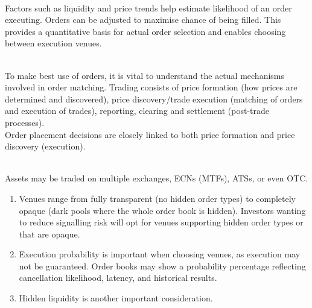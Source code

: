 \begin{remark} \\
Factors such as liquidity and price trends help estimate likelihood of an order executing. Orders can be adjusted to maximise chance of being filled. This provides a quantitative basis for actual order selection and enables choosing between execution venues.
\end{remark}

\begin{remark} \\
To make best use of orders, it is vital to understand the actual mechanisms involved in order matching. Trading consists of price formation (how prices are determined and discovered), price discovery/trade execution (matching of orders and execution of trades), reporting, clearing and settlement (post-trade processes).\\
Order placement decisions are closely linked to both price formation and price discovery (execution).
\end{remark}

\begin{remark} \\
Assets may be traded on multiple exchanges, ECNs (MTFs), ATSs, or even OTC.
\begin{enumerate}[label=\roman*.]
\setlength{\itemsep}{0pt}
\item Venues range from fully transparent (no hidden order types) to completely opaque (dark pools where the whole order book is hidden). Investors wanting to reduce signalling risk will opt for venues supporting hidden order types or that are opaque.
\item Execution probability is important when choosing venues, as execution may not be guaranteed. Order books may show a probability percentage reflecting cancellation likelihood, latency, and historical results.
\item Hidden liquidity is another important consideration.
\end{enumerate}
\end{remark}

